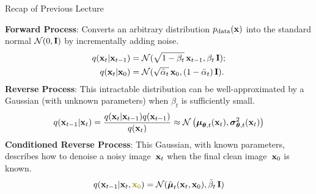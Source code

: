 \documentclass{beamer}
\begin{document}
\begin{frame}
\titlepage
	\resetonslide	
\end{frame}
\begin{frame}{Recap of Previous Lecture}

	\textbf{Forward Process}: Converts an arbitrary distribution $p_{\text{data}}(\mathbf{x})$ into the standard normal $\mathcal{N}(0, \mathbf{I})$ by incrementally adding noise.
	\begin{align*}
		q(\mathbf{x}_t | \mathbf{x}_{t-1}) &= \mathcal{N}(\sqrt{1 - \beta_t}\, \mathbf{x}_{t-1}, \beta_t\, \mathbf{I}); \\
		q(\mathbf{x}_t | \mathbf{x}_0) &= \mathcal{N}(\sqrt{\bar{\alpha}_t}\, \mathbf{x}_0, (1 - \bar{\alpha}_t)\, \mathbf{I}).
	\end{align*}
	\textbf{Reverse Process}: This intractable distribution can be well-approximated by a Gaussian (with unknown parameters) when $\beta_t$ is sufficiently small.
	\[
		q(\mathbf{x}_{t-1}|\mathbf{x}_{t}) = \frac{q(\mathbf{x}_{t}|\mathbf{x}_{t-1}) q(\mathbf{x}_{t-1})}{q(\mathbf{x}_{t})} \approx \mathcal{N} \left(\boldsymbol{\mu}_{\boldsymbol{\theta}, t}(\mathbf{x}_t), \boldsymbol{\sigma}_{\boldsymbol{\theta}, t}^2(\mathbf{x}_t)\right)
	\]
	\textbf{Conditioned Reverse Process}: This Gaussian, with known parameters, describes how to denoise a noisy image~$\mathbf{x}_t$ when the final clean image~$\mathbf{x}_0$ is known.
	\[
		q(\bx_{t-1}|\bx_{t}, {\color{olive}\bx_0}) = \cN(\tilde{\bmu}_t(\bx_t, \bx_0), \tilde{\beta}_t\, \bI)
	\]
\end{frame}
\end{document}

